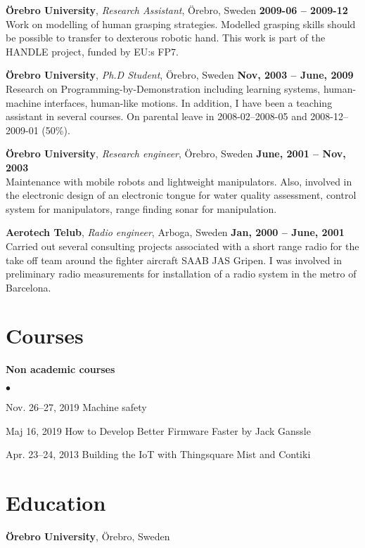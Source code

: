 \documentclass[a4paper,margin,line]{res} \usepackage{latexsym}
\newenvironment{list2}{
  \begin{list}{$\bullet$}{%
      \setlength{\itemsep}{0in} \setlength{\parsep}{0in}
      \setlength{\parskip}{0in} \setlength{\topsep}{0in}
      \setlength{\partopsep}{0in}
      \setlength{\leftmargin}{0.2in}}}{\end{list}}
\begin{document}
\begin{resume}
{\bf \"Orebro University}, {\em Research Assistant}, \"Orebro, Sweden
\hfill {\bf 2009-06 -- 2009-12}\\ Work on modelling of human grasping
strategies. Modelled grasping skills should be possible to transfer to
dexterous robotic hand. This work is part of the HANDLE project,
funded by EU:s FP7.

{\bf \"Orebro University}, {\em Ph.D Student}, \"Orebro, Sweden \hfill
{\bf Nov, 2003 -- June, 2009}\\ Research on
Programming-by-Demonstration including learning systems, human-machine
interfaces, human-like motions.  In addition, I have been a teaching
assistant in several courses.  On parental leave in 2008-02--2008-05
and 2008-12--2009-01 (50\%).

{\bf \"Orebro University}, {\em Research engineer}, \"Orebro, Sweden
\hfill {\bf June, 2001 -- Nov, 2003}\\ Maintenance with mobile robots
and lightweight manipulators. Also, involved in the electronic design
of an electronic tongue for water quality assessment, control system
for manipulators, range finding sonar for manipulation.

{\bf Aerotech Telub}, {\em Radio engineer}, Arboga, Sweden \hfill {\bf
  Jan, 2000 -- June, 2001}\\ Carried out several consulting projects
associated with a short range radio for the take off team around the
fighter aircraft SAAB JAS Gripen.  I was involved in preliminary radio
measurements for installation of a radio system in the metro of
Barcelona.

\section{\sc Courses}
{\bf Non academic courses}\\
\begin{list2}
\item Nov. 26--27, 2019 Machine safety
\item Maj 16, 2019 How to Develop Better Firmware Faster by Jack Ganssle
  \item Apr. 23--24, 2013 Building the IoT with Thingsquare Mist and Contiki
\end{list2}


\section{\sc Education}
{\bf \"Orebro University}, \"Orebro, Sweden\\


\end{resume}
\end{document}
